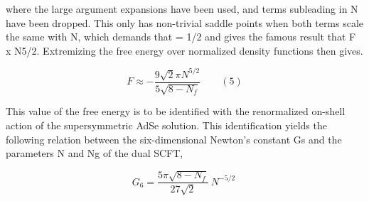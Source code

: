 \documentclass{article}
\begin{document}
where the large argument expansions have been used, and terms subleading in N have been
dropped. This only has non-trivial saddle points when both terms scale the same with N,
which demands that  = 1/2 and gives the famous result that F x N5/2. Extremizing the
free energy over normalized density functions then gives.


\begin{equation}
F \approx - \frac { 9 \sqrt { 2 } \pi N ^ { 5 / 2 } } { 5 \sqrt { 8 - N _ { f } } } \qquad ( 5 )
\end{equation}


This value of the free energy is to be identified with the renormalized on-shell action of the
supersymmetric AdSe solution. This identification yields the following relation between the
six-dimensional Newton's constant Gs and the parameters N and Ng of the dual SCFT,


\begin{equation}
G _ { 6 } = \frac { 5 \pi \sqrt { 8 - N _ { f } } } { 2 7 \sqrt { 2 } } ~ N ^ { - 5 / 2 } ~
\end{equation}
\end{document}
